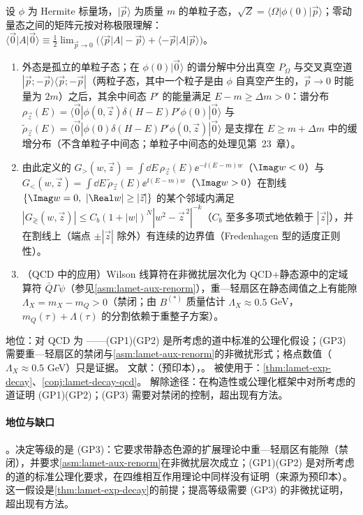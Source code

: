 \begin{assumption}\label{asm:lamet-gap}
设 $\phi$ 为 Hermite 标量场，$|\vec p\rangle$ 为质量 $m$ 的单粒子态，$\sqrt Z=\langle\Omega|\phi(0)|\vec p\rangle$；零动量态之间的矩阵元按对称极限理解：$\langle\vec 0|A|\vec 0\rangle\equiv\frac12\lim_{\vec p\to0}\big(\langle\vec p|A|-\vec p\rangle+\langle-\vec p|A|\vec p\rangle\big)$\cite[第~5.1~节]{Ji:2026vir}。
\begin{enumerate}[label=(GP\arabic*),leftmargin=3.2em,itemsep=1pt,topsep=2pt]
\item 外态是孤立的单粒子态；在 $\phi(0)|\vec 0\rangle$ 的谱分解中分出真空 $P_\Omega$ 与交叉真空道 $|\vec p;-\vec p\rangle\langle\vec p;-\vec p|$（两粒子态，其中一个粒子是由 $\phi$ 自真空产生的，$\vec p\to0$ 时能量为 $2m$）之后，其余中间态 $P'$ 的能量满足 $E-m\ge\Delta m>0$：谱分布 $\rho_{\vec z}(E)=\langle\vec 0|\phi(0,\vec z)\delta(H-E)P'\phi(0)|\vec 0\rangle$ 与 $\tilde\rho_{\vec z}(E)=\langle\vec 0|\phi(0)\delta(H-E)P'\phi(0,\vec z)|\vec 0\rangle$ 是支撑在 $E\ge m+\Delta m$ 中的缓增分布（不含单粒子中间态；单粒子中间态的处理见第~23~章）。
\item 由此定义的 $G_>(w,\vec z)=\int\dd E\,\rho_{\vec z}(E)\ee^{-\ii(E-m)w}$（$\Imag w<0$）与 $G_<(w,\vec z)=\int\dd E\,\tilde\rho_{\vec z}(E)\ee^{\ii(E-m)w}$（$\Imag w>0$）在割线 $\{\Imag w=0,\ |\Real w|\ge|\vec z|\}$ 的某个邻域内满足 $|G_\gtrless(w,\vec z)|\le C_b(1+|w|)^N|w^2-\vec z^{\,2}|^{-k}$（$C_b$ 至多多项式地依赖于 $|\vec z|$），并在割线上（端点 $\pm|\vec z|$ 除外）有连续的边界值（Fredenhagen 型的适度正则性）。
\item （QCD 中的应用）Wilson 线算符在非微扰层次化为 QCD$+$静态源中的定域算符 $\bar Q\Gamma\psi$（参见\cref{asm:lamet-aux-renorm}），重—轻扇区在静态阈值之上有能隙 $\Lambda_X=m_X-m_Q>0$（禁闭；由 $B^{(*)}$ 质量估计 $\Lambda_X\approx0.5$ GeV，$m_Q(\tau)+\Lambda(\tau)$ 的分割依赖于重整子方案）。
\end{enumerate}
地位：对 QCD 为 \tagC——(GP1)(GP2) 是所考虑的道中标准的公理化假设；(GP3) 需要重—轻扇区的禁闭与\cref{asm:lamet-aux-renorm}的非微扰形式；格点数值（$\Lambda_X\approx0.5$ GeV）只是证据。
文献：\cite[第~5~节]{Ji:2026vir}（预印本），\cite{Fredenhagen:1984bz}。
被使用于：\cref{thm:lamet-exp-decay}、\cref{conj:lamet-decay-qcd}。
解除途径：在构造性或公理化框架中对所考虑的道证明 (GP1)(GP2)；(GP3) 需要对禁闭的控制，超出现有方法。
\end{assumption}

\paragraph{地位与缺口}
\tagC。决定等级的是 (GP3)：它要求带静态色源的扩展理论中重—轻扇区有能隙（禁闭），并要求\cref{asm:lamet-aux-renorm}在非微扰层次成立；(GP1)(GP2) 是对所考虑的道的标准公理化要求，在四维相互作用理论中同样没有证明（来源\cite[第~5~节]{Ji:2026vir}为预印本）。这一假设是\cref{thm:lamet-exp-decay}的前提；提高等级需要 (GP3) 的非微扰证明，超出现有方法。

